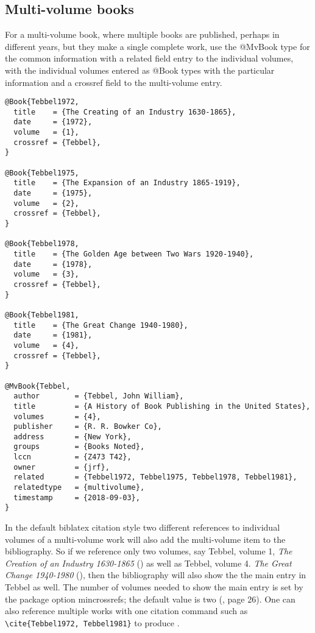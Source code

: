 \subsection{Multi-volume books}

For a multi-volume book, where multiple books are published, perhaps
in different years, but they make a single complete work, use the
{\ttfamily @MvBook} type for the common information with a {\ttfamily
  related} field entry to the individual volumes, with the individual
volumes entered as {\ttfamily @Book} types with the particular
information and a {\ttfamily crossref} field to the multi-volume
entry.

\begin{verbatim}
@Book{Tebbel1972,
  title    = {The Creating of an Industry 1630-1865},
  date     = {1972},
  volume   = {1},
  crossref = {Tebbel},
}

@Book{Tebbel1975,
  title    = {The Expansion of an Industry 1865-1919},
  date     = {1975},
  volume   = {2},
  crossref = {Tebbel},
}

@Book{Tebbel1978,
  title    = {The Golden Age between Two Wars 1920-1940},
  date     = {1978},
  volume   = {3},
  crossref = {Tebbel},
}

@Book{Tebbel1981,
  title    = {The Great Change 1940-1980},
  date     = {1981},
  volume   = {4},
  crossref = {Tebbel},
}

@MvBook{Tebbel,
  author        = {Tebbel, John William},
  title         = {A History of Book Publishing in the United States},
  volumes       = {4},
  publisher     = {R. R. Bowker Co},
  address       = {New York},
  groups        = {Books Noted},
  lccn          = {Z473 T42},
  owner         = {jrf},
  related       = {Tebbel1972, Tebbel1975, Tebbel1978, Tebbel1981},
  relatedtype   = {multivolume},
  timestamp     = {2018-09-03},
}
\end{verbatim}

In the default {\ttfamily biblatex} citation style two different
references to individual volumes of a multi-volume work will also add
the multi-volume item to the bibliography. So if we reference only two
volumes, say Tebbel, volume 1, {\itshape The Creation of an Industry
  1630-1865} (\cite{Tebbel1972}) as well as Tebbel, volume
4. {\itshape The Great Change 1940-1980} (\cite{Tebbel1981}), then the
bibliography will also show the the main entry in Tebbel as well. The
number of volumes needed to show the main entry is set by the package
option {\ttfamily mincrossrefs}; the default value is two
(\cite{Kime2019}, page 26).  One can also reference multiple works
with one citation command such as \verb|\cite{Tebbel1972, Tebbel1981}|
to produce \cite{Tebbel1972, Tebbel1981}.

